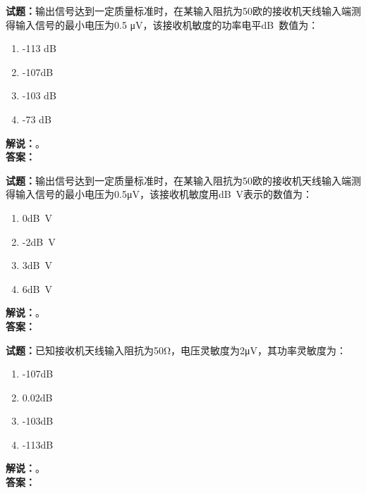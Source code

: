 \documentclass{ctexbook}
\begin{document}
\bigskip




\noindent\textbf{试题：}输出信号达到一定质量标准时，在某输入阻抗为50欧的接收机天线输入端测得输入信号的最小电压为0.5 μV，该接收机敏度的功率电平\unit[qualifier-mode=combine]{\deci\bel{}}数值为：
\begin{enumerate}[leftmargin=3em]
\item -113 \unit[qualifier-mode=combine]{\deci\bel{}}
\item -107\unit[qualifier-mode=combine]{\deci\bel{}}
\item -103 \unit[qualifier-mode=combine]{\deci\bel{}}
\item -73 \unit[qualifier-mode=combine]{\deci\bel{}}
\end{enumerate}
\noindent\textbf{解说：}\textbf{}。\\\noindent\textbf{答案：}

\bigskip




\noindent\textbf{试题：}输出信号达到一定质量标准时，在某输入阻抗为50欧的接收机天线输入端测得输入信号的最小电压为0.5μV，该接收机敏度用\unit[qualifier-mode=combine]{\deci\bel{}}V表示的数值为：
\begin{enumerate}[leftmargin=3em]
\item 0\unit[qualifier-mode=combine]{\deci\bel{}}V
\item -2\unit[qualifier-mode=combine]{\deci\bel{}}V
\item 3\unit[qualifier-mode=combine]{\deci\bel{}}V
\item 6\unit[qualifier-mode=combine]{\deci\bel{}}V
\end{enumerate}
\noindent\textbf{解说：}\textbf{}。\\\noindent\textbf{答案：}

\bigskip




\noindent\textbf{试题：}已知接收机天线输入阻抗为50Ω，电压灵敏度为2μV，其功率灵敏度为：
\begin{enumerate}[leftmargin=3em]
\item -107\unit[qualifier-mode=combine]{\deci\bel{}}
\item 0.02\unit[qualifier-mode=combine]{\deci\bel{}}
\item -103\unit[qualifier-mode=combine]{\deci\bel{}}
\item -113\unit[qualifier-mode=combine]{\deci\bel{}}
\end{enumerate}
\noindent\textbf{解说：}\textbf{}。\\\noindent\textbf{答案：}
\end{document}
